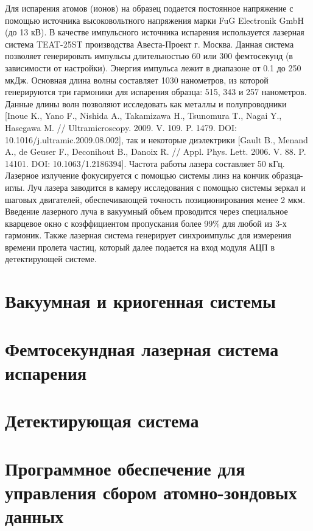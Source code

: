 Для испарения атомов (ионов) на образец подается постоянное напряжение с помощью источника высоковольтного напряжения марки FuG Electronik GmbH (до 13 кВ). В качестве импульсного источника испарения используется лазерная система TEAT-25ST производства Авеста-Проект г. Москва. Данная система позволяет генерировать импульсы длительностью 60 или 300 фемтосекунд (в зависимости от настройки). Энергия импульса лежит в диапазоне от 0.1 до 250 мкДж. Основная длина волны составляет 1030 нанометров, из которой генерируются три гармоники для испарения образца: 515, 343 и 257 нанометров. Данные длины волн позволяют исследовать как металлы и полупроводники [Inoue K., Yano F., Nishida A., Takamizawa H., Tsunomura T., Nagai Y., Hasegawa M. // Ultramicroscopy. 2009. V. 109. P. 1479. DOI: 10.1016/j.ultramic.2009.08.002], так и некоторые диэлектрики [Gault B., Menand A., de Geuser F., Deconihout B., Danoix R. // Appl. Phys. Lett. 2006. V. 88. P. 14101. DOI: 10.1063/1.2186394]. Частота работы лазера составляет 50 кГц. Лазерное излучение фокусируется с помощью системы линз на кончик образца-иглы. Луч лазера заводится в камеру исследования с помощью системы зеркал и шаговых двигателей, обеспечивающей точность позиционирования менее 2 мкм. Введение лазерного луча в вакуумный объем проводится через специальное кварцевое окно с коэффициентом пропускания более 99\% для любой из 3-х гармоник. Также лазерная система генерирует синхроимпульс для измерения времени пролета частиц, который далее подается на вход модуля АЦП в детектирующей системе.

\FloatBarrier

\section{Вакуумная и криогенная системы}\label{sec:ch2/sec2}

\FloatBarrier

\section{Фемтосекундная лазерная система испарения}\label{sec:ch2/sec3}

\FloatBarrier

\section{Детектирующая система}\label{sec:ch2/sec4}

\FloatBarrier

\section{Программное обеспечение для управления сбором атомно-зондовых данных}\label{sec:ch2/sec5}



\FloatBarrier